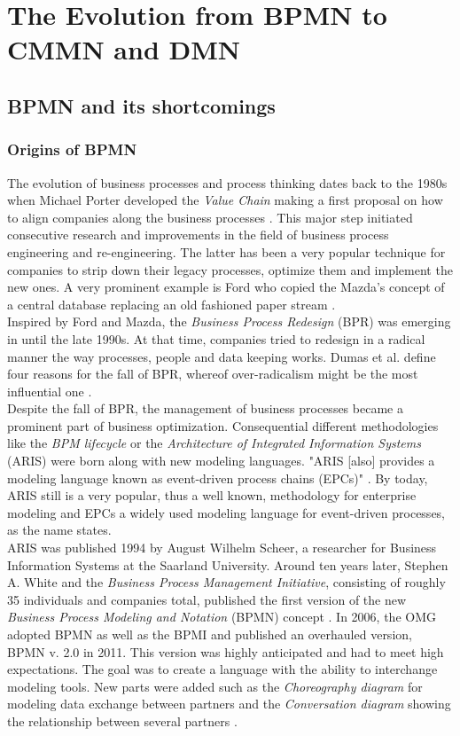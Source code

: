 \chapter{The Evolution from BPMN to CMMN and DMN }
\label{chapter:Background}

\section{BPMN and its shortcomings}
\subsection{Origins of BPMN}
The evolution of business processes and process thinking dates back to the 1980s when Michael Porter developed the \textit{Value Chain} making a first proposal on how to align companies along the business processes \cite{Porter1988}. 
This major step initiated consecutive research and improvements in the field of business process engineering and re-engineering. The latter has been a very popular technique for companies to strip down their legacy processes, optimize them and implement the new ones. A very prominent example is Ford who copied the Mazda's concept of a central database replacing an old fashioned paper stream \cite{Dumas2013}. \\
Inspired by Ford and Mazda, the \textit{Business Process Redesign} (BPR) was emerging in until the late 1990s. At that time, companies tried to redesign in a radical manner the way processes, people and data keeping works. Dumas et al. define four reasons for the fall of BPR, whereof over-radicalism might be the most influential one \cite{Dumas2013}. \\

Despite the fall of BPR, the management of business processes became a prominent part of business optimization. Consequential different methodologies like the \textit{BPM lifecycle} or the \textit{Architecture of Integrated Information Systems} (ARIS) were born along with new modeling languages. "ARIS [also] provides a modeling language known as event-driven process chains (EPCs)" \cite{Lankhorst2009}. By today, ARIS still is a very popular, thus a well known, methodology for enterprise modeling and EPCs a widely used modeling language for event-driven processes, as the name states. \\
ARIS was published 1994 by August Wilhelm Scheer, a researcher for Business Information Systems at the Saarland University. Around ten years later, Stephen A. White and the \textit{Business Process Management Initiative}, consisting of roughly 35 individuals and companies total, published the first version of the new \textit{Business Process Modeling and Notation} (BPMN) concept \cite{Allweyer2010}. In 2006, the OMG adopted BPMN as well as the BPMI and published an overhauled version, BPMN v. 2.0 in 2011. This version was highly anticipated and had to meet high expectations. The goal was to create a language with the ability to interchange modeling tools. New parts were added such as the \textit{Choreography diagram} for modeling data exchange between partners and the \textit{Conversation diagram} showing the relationship between several partners \cite{Allweyer2010}. 

